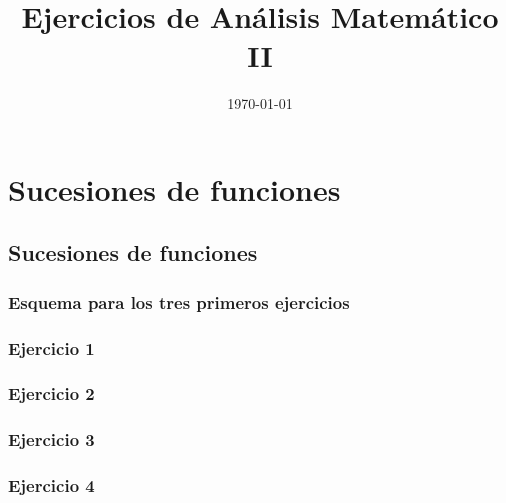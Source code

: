 \documentclass[11pt,spanish]{article} %
\title{Ejercicios de Análisis Matemático II}
\author{ }
\date{\today}
\begin{document}
\maketitle
\tableofcontents %
\newpage
\setlength\parindent{0pt} %

\section{Sucesiones de funciones}
\subsection{Sucesiones de funciones}
	\subsubsection{Esquema para los tres primeros ejercicios}
	
	\subsubsection{Ejercicio 1}
	
	\subsubsection{Ejercicio 2}
	
	\subsubsection{Ejercicio 3}
	
	\subsubsection{Ejercicio 4}
	
\end{document}
